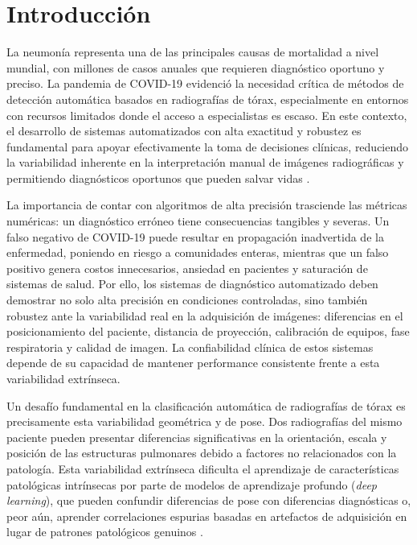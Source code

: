 
\chapter{Introducci\'on}
\label{cap:introduccion}

La neumonía representa una de las principales causas de mortalidad a nivel mundial, con millones de casos anuales que requieren diagn\'ostico oportuno y preciso. La pandemia de COVID-19 evidenci\'o la necesidad crítica de métodos de detección automática basados en radiografías de tórax, especialmente en entornos con recursos limitados donde el acceso a especialistas es escaso. En este contexto, el desarrollo de sistemas automatizados con alta exactitud y robustez es fundamental para apoyar efectivamente la toma de decisiones cl\'inicas, reduciendo la variabilidad inherente en la interpretaci\'on manual de im\'agenes radiogr\'aficas y permitiendo diagn\'osticos oportunos que pueden salvar vidas \cite{who2020chest}.

La importancia de contar con algoritmos de alta precisión trasciende las métricas numéricas: un diagnóstico erróneo tiene consecuencias tangibles y severas. Un falso negativo de COVID-19 puede resultar en propagación inadvertida de la enfermedad, poniendo en riesgo a comunidades enteras, mientras que un falso positivo genera costos innecesarios, ansiedad en pacientes y saturaci\'on de sistemas de salud. Por ello, los sistemas de diagn\'ostico automatizado deben demostrar no solo alta precisi\'on en condiciones controladas, sino tambi\'en robustez ante la variabilidad real en la adquisici\'on de im\'agenes: diferencias en el posicionamiento del paciente, distancia de proyecci\'on, calibraci\'on de equipos, fase respiratoria y calidad de imagen. La confiabilidad cl\'inica de estos sistemas depende de su capacidad de mantener performance consistente frente a esta variabilidad extr\'inseca.

Un desafío fundamental en la clasificación automática de radiografías de t\'orax es precisamente esta variabilidad geom\'etrica y de pose. Dos radiograf\'ias del mismo paciente pueden presentar diferencias significativas en la orientaci\'on, escala y posici\'on de las estructuras pulmonares debido a factores no relacionados con la patolog\'ia. Esta variabilidad extr\'inseca dificulta el aprendizaje de caracter\'isticas patol\'ogicas intr\'insecas por parte de modelos de aprendizaje profundo (\textit{deep learning}), que pueden confundir diferencias de pose con diferencias diagn\'osticas o, peor a\'un, aprender correlaciones espurias basadas en artefactos de adquisici\'on en lugar de patrones patol\'ogicos genuinos \cite{geirhos2020shortcut}.

